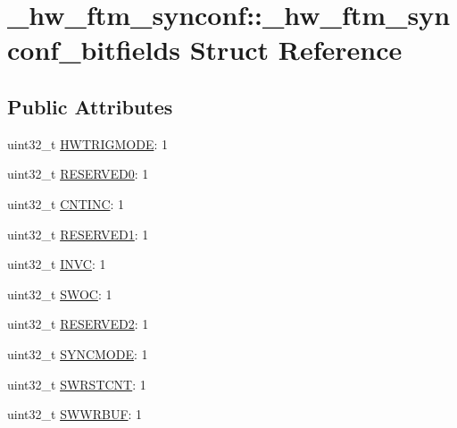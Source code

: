\hypertarget{struct__hw__ftm__synconf_1_1__hw__ftm__synconf__bitfields}{}\section{\+\_\+hw\+\_\+ftm\+\_\+synconf\+:\+:\+\_\+hw\+\_\+ftm\+\_\+synconf\+\_\+bitfields Struct Reference}
\label{struct__hw__ftm__synconf_1_1__hw__ftm__synconf__bitfields}
\subsection*{Public Attributes}
\begin{DoxyCompactItemize}
\item 
uint32\+\_\+t \hyperlink{struct__hw__ftm__synconf_1_1__hw__ftm__synconf__bitfields_a11adce43cecd73b06f9e17b60d106ccf}{H\+W\+T\+R\+I\+G\+M\+O\+DE}\+: 1
\item 
uint32\+\_\+t \hyperlink{struct__hw__ftm__synconf_1_1__hw__ftm__synconf__bitfields_a84111c99073c3f24ba5e9236093b3531}{R\+E\+S\+E\+R\+V\+E\+D0}\+: 1
\item 
uint32\+\_\+t \hyperlink{struct__hw__ftm__synconf_1_1__hw__ftm__synconf__bitfields_a9b4f0ef0fa5ebac25bb025fe6feeaf1c}{C\+N\+T\+I\+NC}\+: 1
\item 
uint32\+\_\+t \hyperlink{struct__hw__ftm__synconf_1_1__hw__ftm__synconf__bitfields_aab0c232012fb5012f201d607df596c25}{R\+E\+S\+E\+R\+V\+E\+D1}\+: 1
\item 
uint32\+\_\+t \hyperlink{struct__hw__ftm__synconf_1_1__hw__ftm__synconf__bitfields_a567853398224a31074574acc7c492a7c}{I\+N\+VC}\+: 1
\item 
uint32\+\_\+t \hyperlink{struct__hw__ftm__synconf_1_1__hw__ftm__synconf__bitfields_ace36ff7819a783d4d755dd6564c1122a}{S\+W\+OC}\+: 1
\item 
uint32\+\_\+t \hyperlink{struct__hw__ftm__synconf_1_1__hw__ftm__synconf__bitfields_a4eedcc5923fc27f0a0e330021ecf95d2}{R\+E\+S\+E\+R\+V\+E\+D2}\+: 1
\item 
uint32\+\_\+t \hyperlink{struct__hw__ftm__synconf_1_1__hw__ftm__synconf__bitfields_a1f1d0330e9e506021401c13595d8a331}{S\+Y\+N\+C\+M\+O\+DE}\+: 1
\item 
uint32\+\_\+t \hyperlink{struct__hw__ftm__synconf_1_1__hw__ftm__synconf__bitfields_a59d8571f68cf3fec765abf4e78d8b5ee}{S\+W\+R\+S\+T\+C\+NT}\+: 1
\item 
uint32\+\_\+t \hyperlink{struct__hw__ftm__synconf_1_1__hw__ftm__synconf__bitfields_a188601a567cce018525ece074d587d16}{S\+W\+W\+R\+B\+UF}\+: 1

\end{DoxyCompactItemize}
